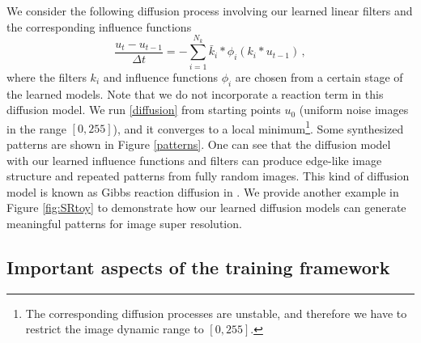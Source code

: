\documentclass[10pt,journal,compsoc]{IEEEtran}
\newcommand{\eg}{\emph{e.g.}}
\newcommand{\ie}{\emph{i.e.}}
\begin{document}
We consider the following diffusion process involving our learned linear filters and the corresponding influence functions
\begin{equation}\label{diffusion}
\frac{u_{t} - u_{t-1}}{\Delta t} = 
-\sum\limits_{i = 1}^{N_k}\bar k_i * \phi_i(k_i * u_{t-1}) \,,
\end{equation}
where the filters $k_i$ and influence functions $\phi_i$ are chosen from a certain stage of the learned models. Note that we 
do not incorporate a reaction term in this diffusion model. We run \eqref{diffusion} 
from starting points $u_0$ (uniform 
noise images in the range $[0, 255]$), and it converges to a local minimum\footnote{The corresponding diffusion processes are 
unstable, and therefore we have to restrict the image dynamic range to $[0, 255]$.}. Some synthesized patterns are 
shown in Figure \ref{patterns}. One can see that the diffusion model with our learned influence functions and filters can 
produce edge-like image structure and repeated patterns from fully random images. 
This kind of diffusion model is known as Gibbs reaction diffusion in \cite{zhu1997prior}. 
We provide another example in Figure \ref{fig:SRtoy} 
to demonstrate how our learned diffusion models can generate meaningful patterns for image super resolution. 

\begin{comment}
Moreover, in the diffusion model \eqref{diffusion}, if we replace the learned influence functions $\phi_i$ with a 
usual influence function, \eg, $\phi(z) = \frac{2z}{1+z^2}$ used in the PM model, the final state of this diffusion process 
is a constant image of the average gray value of the input image. 
Usually, people think that the PM model with the influence function of the form 
$\phi(z) = \frac{2z}{1+z^2}$ (the corresponding penalty function given as $\rho(z) = \text{log}(1+z^2)$), 
owns the property of edge preserving. 
However, it can not really preserve image edges during diffusion, because the involved penalty function 
always penalize edge response, unless it is zero, \ie, a flat image. 
It turns out that this type of influence functions 
can only slow down the diffusion (image smoothing) across image edges, but they can not stop the diffusion. 
However, those unconventional influence functions in our learned models can not only stop the diffusion across image edges, but 
also enhance/sharpen image structures. 
\end{comment}

\subsection{Important aspects of the training framework}\label{important}
\end{document}
